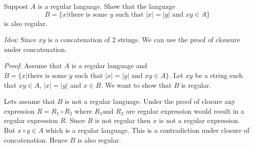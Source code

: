 \question %
Suppost $A$ is a regular language. Show that the language
\[B = \{x | \text{there is some } y \text{ such that } |x| = |y| \text{ and } xy \in A \}\]
is also regular.

\begin{solution}

  \emph{Idea}: Since $xy$ is a concatenation of 2 strings. We can use the proof of clousure under concatenation.

  \emph{Proof}: Assume that $A$ is a regular language and $B = \{x|{} \text{there is some }y \text{ such that } |x| = |y| \text{ and } xy\in A\}$. Let $xy$ be a string such that $xy\in A$, $|x|=|y|$ and $x\in B$. We want to show that $B$ is regular.


  Lets assume that $B$ is not a regular language. Under the proof of closure any expression $R = R_{1} \circ R_{2}$ where $R_{1} \text{and } R_{2}$ are regular expression would result in a regular expression $R$. Since $B$ is not regular then $x$ is not a regular expression. But $x\circ y\in A$ which is a regular language. This is a contradiction under closure of concatenation. Hence $B$ is also regular.


\end{solution}



\question %


